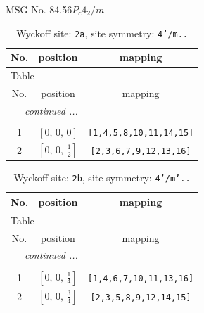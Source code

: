 \documentclass[fleqn,8pt]{jsarticle}
\begin{document}
\setcounter{MaxMatrixCols}{32}

\renewcommand{\tablename}{Table~}
\renewcommand{\figurename}{Figure~}
\begin{center}
\LARGE
MSG No. 84.56\quad$P_{c}4_{2}/m$
\end{center}
\renewcommand{\arraystretch}{1.2}
\begin{longtable}{ccc}
\caption{Wyckoff site: {\tt 2a}, site symmetry: {\tt 4'/m..}}
 \\
 \hline \hline
No. & position & mapping \\ \hline \endfirsthead

\multicolumn{2}{l}{\tablename\ \thetable{}} \\
 \hline \hline
No. & position & mapping \\ \hline \endhead

 \hline \hline
\multicolumn{2}{r}{\footnotesize\it continued ...} \\ \endfoot

 \hline \hline
\multicolumn{2}{r}{} \\ \endlastfoot

1 & $\left[ 0,\, 0,\, 0 \right]$ & {\tt [1,4,5,8,10,11,14,15]} \\ \hline
2 & $\left[ 0,\, 0,\, \frac{1}{2} \right]$ & {\tt [2,3,6,7,9,12,13,16]} \\
\end{longtable}
\renewcommand{\arraystretch}{1.2}
\begin{longtable}{ccc}
\caption{Wyckoff site: {\tt 2b}, site symmetry: {\tt 4'/m'..}}
 \\
 \hline \hline
No. & position & mapping \\ \hline \endfirsthead

\multicolumn{2}{l}{\tablename\ \thetable{}} \\
 \hline \hline
No. & position & mapping \\ \hline \endhead

 \hline \hline
\multicolumn{2}{r}{\footnotesize\it continued ...} \\ \endfoot

 \hline \hline
\multicolumn{2}{r}{} \\ \endlastfoot

1 & $\left[ 0,\, 0,\, \frac{1}{4} \right]$ & {\tt [1,4,6,7,10,11,13,16]} \\ \hline
2 & $\left[ 0,\, 0,\, \frac{3}{4} \right]$ & {\tt [2,3,5,8,9,12,14,15]} \\
\end{longtable}
\end{document}
